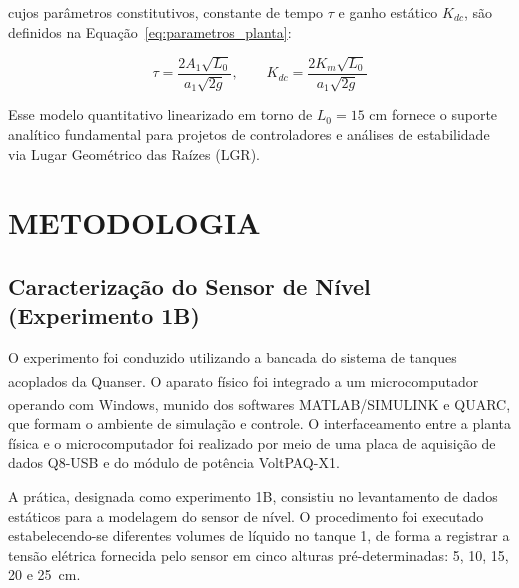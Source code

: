 \documentclass[a4paper,12pt]{article}
\begin{document}
\begin{justify}
    \noindent cujos parâmetros constitutivos, constante de tempo $\tau$ e ganho estático $K_{dc}$, são definidos na Equação~\eqref{eq:parametros_planta}:
\end{justify}

\begin{equation}
    \tau = \frac{2 A_1 \sqrt{L_0}}{a_1 \sqrt{2g}}, \qquad K_{dc} = \frac{2 K_m \sqrt{L_0}}{a_1 \sqrt{2g}}
    \label{eq:parametros_planta}
\end{equation}

\begin{justify}
    \noindent Esse modelo quantitativo linearizado em torno de $L_0 = 15\text{ cm}$ fornece o suporte analítico fundamental para projetos de controladores e análises de estabilidade via Lugar Geométrico das Raízes (LGR).
\end{justify}

\newpage


\thispagestyle{main}

\section{METODOLOGIA}

\subsection{Caracterização do Sensor de Nível (Experimento 1B)}

\begin{justify}
    \hspace{4ex}O experimento foi conduzido utilizando a bancada do sistema de tanques acoplados da Quanser\textsuperscript{\textregistered}. O aparato físico foi integrado a um microcomputador operando com Windows, munido dos softwares MATLAB\textsuperscript{\textregistered}/SIMULINK\textsuperscript{\textregistered} e QUARC\textsuperscript{\textregistered}, que formam o ambiente de simulação e controle. O interfaceamento entre a planta física e o microcomputador foi realizado por meio de uma placa de aquisição de dados Q8-USB e do módulo de potência VoltPAQ-X1.
\end{justify}

\begin{justify}
    \hspace{4ex}A prática, designada como experimento 1B, consistiu no levantamento de dados estáticos para a modelagem do sensor de nível. O procedimento foi executado estabelecendo-se diferentes volumes de líquido no tanque 1, de forma a registrar a tensão elétrica fornecida pelo sensor em cinco alturas pré-determinadas: 5, 10, 15, 20 e 25~cm.
\end{justify}
\end{document}
